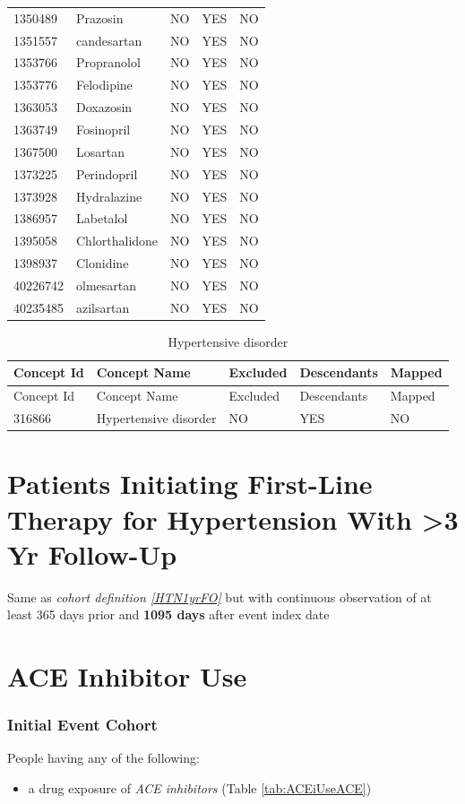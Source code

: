 \documentclass[11pt]{book}
\providecommand{\tightlist}{%
  \setlength{\itemsep}{0pt}\setlength{\parskip}{0pt}}
\theoremstyle{definition}
\theoremstyle{definition}
\theoremstyle{definition}
\theoremstyle{remark}
\begin{document}
\begin{longtable}[]{@{}lllll@{}}
1350489 & Prazosin & NO & YES & NO\tabularnewline
1351557 & candesartan & NO & YES & NO\tabularnewline
1353766 & Propranolol & NO & YES & NO\tabularnewline
1353776 & Felodipine & NO & YES & NO\tabularnewline
1363053 & Doxazosin & NO & YES & NO\tabularnewline
1363749 & Fosinopril & NO & YES & NO\tabularnewline
1367500 & Losartan & NO & YES & NO\tabularnewline
1373225 & Perindopril & NO & YES & NO\tabularnewline
1373928 & Hydralazine & NO & YES & NO\tabularnewline
1386957 & Labetalol & NO & YES & NO\tabularnewline
1395058 & Chlorthalidone & NO & YES & NO\tabularnewline
1398937 & Clonidine & NO & YES & NO\tabularnewline
40226742 & olmesartan & NO & YES & NO\tabularnewline
40235485 & azilsartan & NO & YES & NO\tabularnewline
\bottomrule
\end{longtable}

\begin{longtable}[]{@{}lllll@{}}
\caption{\label{tab:HTN1yrFOHypertensiveDisorder} Hypertensive
disorder}\tabularnewline
\toprule
Concept Id & Concept Name & Excluded & Descendants &
Mapped\tabularnewline
\midrule
\endfirsthead
\toprule
Concept Id & Concept Name & Excluded & Descendants &
Mapped\tabularnewline
\midrule
\endhead
316866 & Hypertensive disorder & NO & YES & NO\tabularnewline
\bottomrule
\end{longtable}

\section{Patients Initiating First-Line Therapy for Hypertension With
\textgreater{}3 Yr Follow-Up}\label{HTN3yrFO}

Same as \emph{cohort definition \ref{HTN1yrFO}} but with continuous
observation of at least 365 days prior and \textbf{1095 days} after
event index date

\section{ACE Inhibitor Use}\label{ACEiUse}

\subsubsection*{Initial Event Cohort}\label{initial-event-cohort-6}

People having any of the following:

\begin{itemize}
\tightlist
\item
  a drug exposure of \emph{ACE inhibitors} (Table \ref{tab:ACEiUseACE})
\end{itemize}
\end{document}
